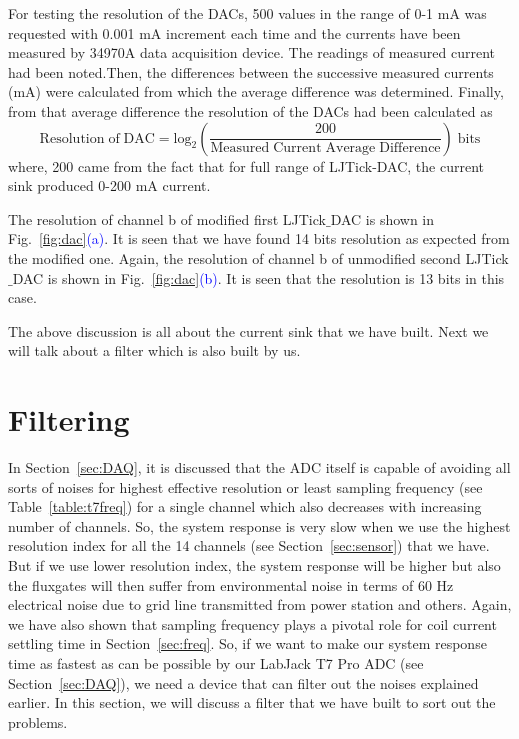 For testing the resolution of the DACs, 500 values in the range of  0-1 mA was requested with 0.001 mA increment each time and the currents have been measured by 34970A data acquisition device. The readings of measured current had been noted.Then, the differences between the successive measured currents (mA)  were calculated from which the average difference was determined. Finally, from that average difference the resolution of the DACs had been calculated as
\begin{equation}
\mathrm{Resolution\;of\;DAC= log_2\left(\frac{200}{Measured\;Current\;Average\;Difference}\right)\;bits}
\end{equation}
where, 200 came from the fact that for full range of LJTick-DAC, the current sink produced 0-200 mA current.


The resolution of channel b of modified first LJTick$\_$DAC is shown in Fig.~\ref{fig:dac}\textcolor{blue}{(a)}. It is seen that we have found 14 bits resolution as expected from the modified one. Again, the resolution of channel b of unmodified second LJTick$\_$DAC is shown in Fig.~\ref{fig:dac}\textcolor{blue}{(b)}. It is seen that the resolution is 13 bits in this case.


The above discussion is all about the current sink that we have built. Next we will talk about a filter which is also built by us.





\section{Filtering}\label{sec:filter}
In Section~\ref{sec:DAQ}, it is discussed that the ADC itself is capable of avoiding all sorts of noises for highest effective resolution or least sampling frequency (see Table~\ref{table:t7freq}) for a single channel which also decreases with increasing number of channels. So, the system response is very slow when we use the highest resolution index for all the 14 channels (see Section~\ref{sec:sensor}) that we have. But if we use lower resolution index, the system response will be higher but also the fluxgates will then suffer from environmental noise in terms of 60 Hz electrical noise due to grid line transmitted from power station and others. Again, we have also shown that sampling frequency plays a pivotal role for coil current settling time in Section~\ref{sec:freq}. So, if we want to make our system response time as fastest as can be possible by our LabJack T7 Pro ADC (see Section~\ref{sec:DAQ}), we need a device that can filter out the noises explained earlier. In this section, we will discuss a filter that we have built to sort out the problems.

